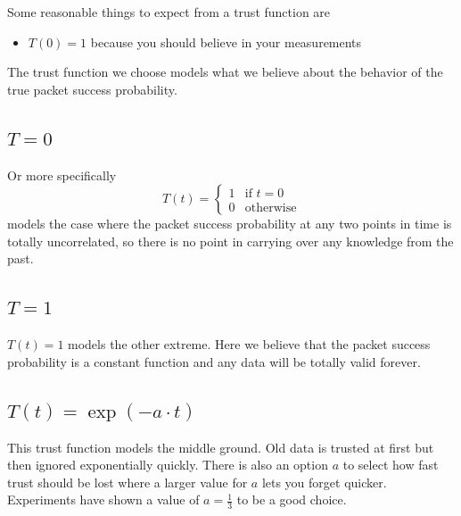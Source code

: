 \documentclass[10pt,a4paper]{article}
\begin{document}
Some reasonable things to expect from a trust function are
\begin{itemize}
\item $T(0) = 1$ because you should believe in your measurements
\end{itemize}

The trust function we choose models what we believe about the behavior of the true packet success probability.

\subsection{$T = 0$}

Or more specifically
\begin{equation*}
  T(t) = \begin{cases}
    1 & \text{if $t = 0$}\\
    0 & \text{otherwise}
  \end{cases}
\end{equation*}
models the case where the packet success probability at any two points in time is totally uncorrelated, so there is no point in carrying over any knowledge from the past.

\subsection{$T = 1$}

$T(t) = 1$ models the other extreme.
Here we believe that the packet success probability is a constant function and any data will be totally valid forever.

\subsection{$T(t) = \exp\left( -a \cdot t \right)$}

This trust function models the middle ground.
Old data is trusted at first but then ignored exponentially quickly.
There is also an option $a$ to select how fast trust should be lost where a larger value for $a$ lets you forget quicker.
Experiments have shown a value of $a = \frac{1}{3}$ to be a good choice.
\end{document}
